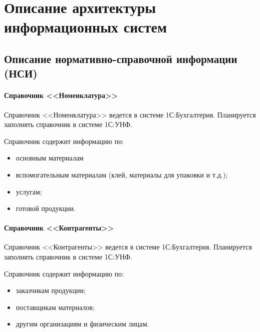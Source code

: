 
\newpage

\chapter{Описание архитектуры информационных систем}




\section{Описание нормативно-справочной информации (НСИ)}

\subsubsection{Справочник <<Номенклатура>>}

Справочник <<Номенклатура>> ведется в системе 1С:Бухгалтерия.
Планируется заполнять справочник в системе 1С:УНФ.



Справочник содержит информацию по:
\begin{itemize}
\item основным материалам %
\item вспомогательным материалам (клей, материалы для упаковки и т.д.);
\item услугам;
\item готовой продукции.
\end{itemize}

\subsubsection{Справочник <<Контрагенты>>}

Справочник <<Контрагенты>> ведется в системе 1С:Бухгалтерия.
Планируется заполнять справочник в системе 1С:УНФ.

Справочник содержит информацию по:

\begin{itemize}
\item заказчикам продукции;
\item поставщикам материалов;
\item другим организациям и физическим лицам.
\end{itemize}

